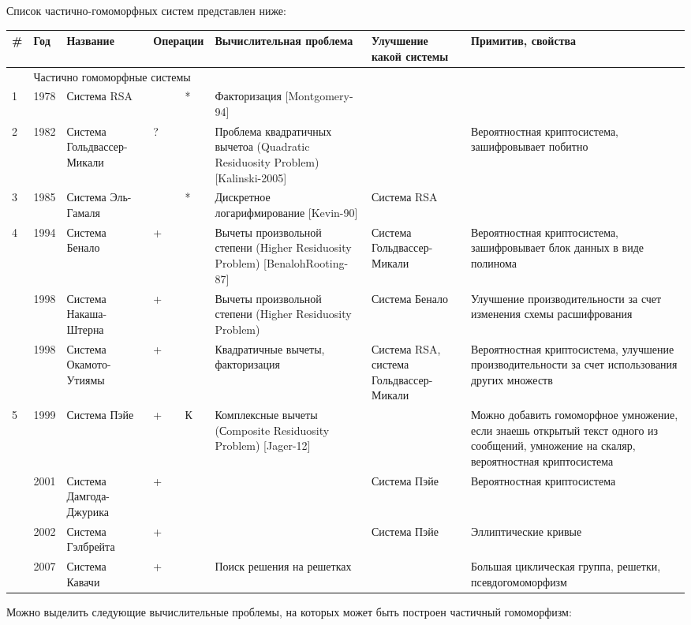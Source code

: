     Список частично-гомоморфных систем представлен ниже:
    \tiny
    \begin{longtable}{|p{0.1in}|p{0.3in}|p{0.7in}|p{0.2in}|p{0.2in}|p{0.9in}|p{0.7in}|p{1.3in}|}\hline 
        \#  & Год & Название & \multicolumn{2}{|p{0.4in}|}{Операции} & Вычислительная проблема & Улучшение какой системы & Примитив, свойства \\ \hline 
            & \multicolumn{7}{|p{4.3in}|}{Частично гомоморфные системы} \\ \hline 
        1   & 1978 & Система RSA &  & * & Факторизация [Montgomery-94] &  &  \\ \hline 
        2   & 1982 & Система Гольдвассер-Микали & ? &  & Проблема квадратичных вычетоа (Quadratic Residuosity Problem) [Kalinski-2005] &  & Вероятностная криптосистема, зашифровывает побитно \\ \hline 
        3   & 1985 & Система Эль-Гамаля &  & * & Дискретное логарифмирование [Kevin-90] & Система RSA &  \\ \hline 
        4   & 1994 & Система Бенало & + &  & Вычеты произвольной степени (Higher Residuosity Problem) [BenalohRooting-87] & Система Гольдвассер-Микали & Вероятностная криптосистема, зашифровывает блок данных в виде полинома \\ \hline 
            & 1998 & Система Накаша-Штерна & + &  & Вычеты произвольной степени (Higher Residuosity Problem) & Система Бенало & Улучшение производительности за счет изменения схемы расшифрования \\ \hline 
            & 1998 & Система Окамото-Утиямы & + &  & Квадратичные вычеты, факторизация & Система RSA, система Гольдвассер-Микали & Вероятностная криптосистема, улучшение производительности за счет использования других множеств \\ \hline 
        5   & 1999 & Система Пэйе & + & К & Комплексные вычеты (Сomposite Residuosity Problem) [Jager-12] &  & Можно добавить гомоморфное умножение, если знаешь открытый текст одного из сообщений, умножение на скаляр, вероятностная криптосистема \\ \hline 
            & 2001 & Система Дамгода-Джурика & + &  &  & Система Пэйе & Вероятностная криптосистема \\ \hline 
            & 2002 & Система Гэлбрейта & + &  &  & Система Пэйе & Эллиптические кривые \\ \hline 
            & 2007 & Система Кавачи & + &  & Поиск решения на решетках &  & Большая циклическая группа, решетки, псевдогомоморфизм \\ \hline 
    \end{longtable}
    \normalsize
\normalcolor
    Можно выделить следующие вычислительные проблемы, на которых может быть построен частичный гомоморфизм:

